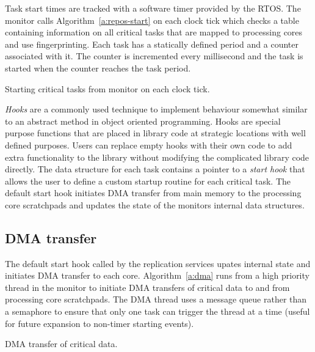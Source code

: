 	Task start times are tracked with a software timer provided by the RTOS. 
	The monitor calls Algorithm~\ref{a:repos-start} on each clock tick which checks a table containing information on all critical tasks that are mapped to processing cores and use fingerprinting. 
	Each task has a statically defined period and a counter associated with it. 
	The counter is incremented every millisecond and the task is started when the counter reaches the task period.

\begin{algorithm}
\caption{Starting critical tasks from monitor on each clock tick.}
\label{a:repos-start}
\end{algorithm}	

	\emph{Hooks} are a commonly used technique to implement behaviour somewhat similar to an abstract method in object oriented programming. 
	Hooks are special purpose functions that are placed in library code at strategic locations with well defined purposes. 
	Users can replace empty hooks with their own code to add extra functionality to the library without modifying the complicated library code directly. 
	The data structure for each task contains a pointer to a \emph{start hook} that allows the user to define a custom startup routine for each critical task.
	The default start hook initiates DMA transfer from main memory to the processing core scratchpads and updates the state of the monitors internal data structures.
	



\subsection{DMA transfer}
\label{s:dma-trans}
	The default start hook called by the replication services upates internal state and initiates DMA transfer to each core. 
	Algorithm~\ref{a:dma} runs from a high priority thread in the monitor to initiate DMA transfers of critical data to and from processing core scratchpads.
	The DMA thread uses a message queue rather than a semaphore to ensure that only one task can trigger the thread at a time (useful for future expansion to non-timer starting events).

\begin{algorithm}

\caption{DMA transfer of critical data.}
\label{a:dma}
\end{algorithm}

